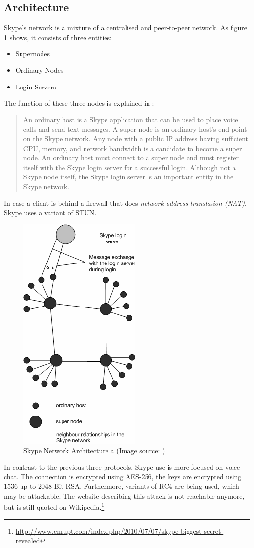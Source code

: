 \subsection{Architecture}
Skype's network is a mixture of a centralised and peer-to-peer network.
As figure \ref{skypearch} shows, it consists of three entities:
\begin{itemize}
\item Supernodes
\item Ordinary Nodes
\item Login Servers
\end{itemize}
The function of these three nodes is explained in \cite{skype-analysis}:
\begin{quote}
An ordinary host is
a Skype application that can be used to place voice calls and send
text messages. A super node is an ordinary host’s end-point on the
Skype network. Any node with a public IP address having
sufficient CPU, memory, and network bandwidth is a candidate to
become a super node. An ordinary host must connect to a super
node and must register itself with the Skype login server for a
successful login. Although not a Skype node itself, the Skype
login server is an important entity in the Skype network.
\end{quote}
In case a client is behind a firewall that does
\textit{network address translation (NAT)}, 
Skype uses a variant of STUN\cite{rfc5389}.
\begin{figure}
    \centering
    \caption[Skype Network Architecture]{Skype Network Architecture a (Image source: \cite{skype-analysis})}
    \label{skypearch}
    \includegraphics[scale=0.8]{skype-network.png}
\end{figure}
In contrast to the previous three protocols, Skype use is more focused on voice chat.
The connection is encrypted using AES-256, the keys are encrypted using
1536 up to 2048 Bit RSA.
Furthermore, variants of RC4 are being used, which may be attackable.
The website describing this attack is not reachable anymore, but 
is still quoted
on Wikipedia.\footnote{\url{http://www.enrupt.com/index.php/2010/07/07/skype-biggest-secret-revealed}}
